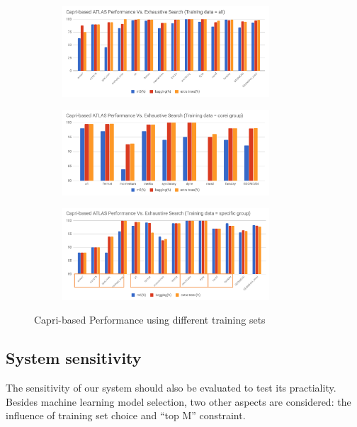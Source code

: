   \begin{figure}[tbhp]
    \centering
    \begin{subfigure}[b]{1.0\linewidth}
      \centering
      \includegraphics[width=0.85\textwidth]{images/all_perf.png}
      \caption{ }
      \label{fig:all_perf}
    \end{subfigure}
    \begin{subfigure}[b]{1.0\linewidth}
      \centering
      \includegraphics[width=0.85\textwidth]{images/corei_perf.png}
      \caption{ }
      \label{fig:corei_perf}
    \end{subfigure}
    \begin{subfigure}[b]{1.0\linewidth}
      \centering
      \includegraphics[width=0.85\textwidth]{images/specific_perf.png}
      \caption{ }
      \label{fig:specific_perf}
    \end{subfigure}
  \caption{Capri-based \atl Performance using different training sets}
  \end{figure}

  \subsection{System sensitivity}
  \label{sec:system_sensitivity}
    The sensitivity of our system should also be evaluated to test its
    practiality. Besides machine learning model selection, two other aspects
    are considered: the influence of training set choice and ``top M''
    constraint.

